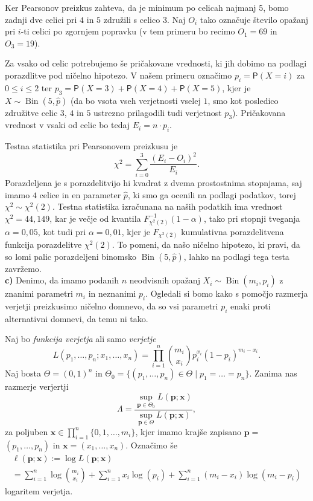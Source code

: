 \documentclass[a4paper,11pt]{article}
\newcommand{\sumin}{\sum_{i = 1}^n}
\newcommand{\inv}{^{-1}}
\DeclareMathOperator{\bin}{Bin}
\begin{document}
Ker Pearsonov preizkus zahteva, da je minimum po celicah najmanj 5, bomo zadnji dve celici pri $4$ in $5$ združili s celico $3$. Naj $O_i$ tako označuje število opažanj pri $i$-ti celici po zgornjem popravku (v tem primeru bo recimo $O_1 = 69$ in $O_3 = 19$). 

Za vsako od celic potrebujemo še pričakovane vrednosti, ki jih dobimo na podlagi porazdlitve pod ničelno hipotezo. V našem primeru označimo $p_i = \mathsf{P}(X = i)$ za $0 \leq i \leq 2$ ter $p_3 = \mathsf{P}(X = 3) + \mathsf{P}(X = 4) + \mathsf{P}(X = 5)$, kjer je $X \sim \bin(5, \hat{p})$ (da bo vsota vseh verjetnosti vselej $1$, smo kot posledico združitve celic $3$, $4$ in $5$ ustrezno prilagodili tudi verjetnost $p_3$). Pričakovana vrednost v vsaki od celic bo tedaj $E_i = n \cdot p_i$.

Testna statistika pri Pearsonovem preizkusu je 
\[
    \chi^2 = \sum_{i = 0}^3 \frac{(E_i - O_i)^2}{E_i}.
\]
Porazdeljena je s porazdelitvijo hi kvadrat z dvema prostostnima stopnjama, saj imamo $4$ celice in en parameter $\hat p$, ki smo ga ocenili na podlagi podatkov, torej $\chi^2 \sim \chi^2(2)$. Testna statistika izračunana na naših podatkih ima vrednost $\chi^2 = 44,149$, kar je večje od kvantila $F_{\chi^2(2)}\inv(1 - \alpha)$, tako pri stopnji tveganja $\alpha = 0,05$, kot tudi pri $\alpha = 0,01$, kjer je $F_{\chi^2(2)}$ kumulativna porazdelitvena funkcija porazdelitve $\chi^2(2)$. To pomeni, da našo ničelno hipotezo, ki pravi, da so lomi palic porazdeljeni binomsko $\bin(5, \hat{p})$, lahko na podlagi tega testa zavržemo.
\\

\noindent
\textbf{c)} Denimo, da imamo podanih $n$ neodvisnih opažanj $X_i \sim \bin(m_i, p_i)$ z znanimi parametri $m_i$ in neznanimi $p_i$. Ogledali si bomo kako s pomočjo razmerja verjetji preizkusimo ničelno domnevo, da so vsi parametri $p_i$ enaki proti alternativni domnevi, da temu ni tako. 

Naj bo \emph{funkcija verjetja} ali samo \emph{verjetje}
\[
    L(p_1, \ldots, p_n; x_1, \ldots, x_n)  = \prod_{i = 1}^n \binom{m_i}{x_i}p_i^{x_i} (1 - p_i)^{m_i - x_i}. 
\]
Naj bosta $\Theta = (0,1)^n$ in $\Theta_0 = \{(p_1, \ldots, p_n) \in \Theta \mid p_1 = \dots = p_n\}$. Zanima nas razmerje verjertji
\[
    \Lambda = \frac{\sup_{\bm{p} \in \Theta_0} L(\bm{p}; \bm{x})}{\sup_{\bm{p} \in \Theta} L(\bm{p}; \bm{x})},   
\]
za poljuben $\bm{x} \in \prod_{i = 1}^n\{0,1,\ldots, m_i\}$, kjer imamo krajše zapisano $\bm{p} =$ \linebreak $(p_1, \ldots, p_n)$ in $\bm{x} = (x_1, \ldots, x_n)$. Označimo še 
\begin{multline*}
    \ell(\bm{p}; \bm{x}) := 
    \log L(\bm{p}; \bm{x}) \\ = 
    \sumin \log \binom{m_i}{x_i} + \sumin x_i \log(p_i) + \sumin (m_i - x_i) \log(m_i - p_i)
\end{multline*}
logaritem verjetja.
\end{document}
